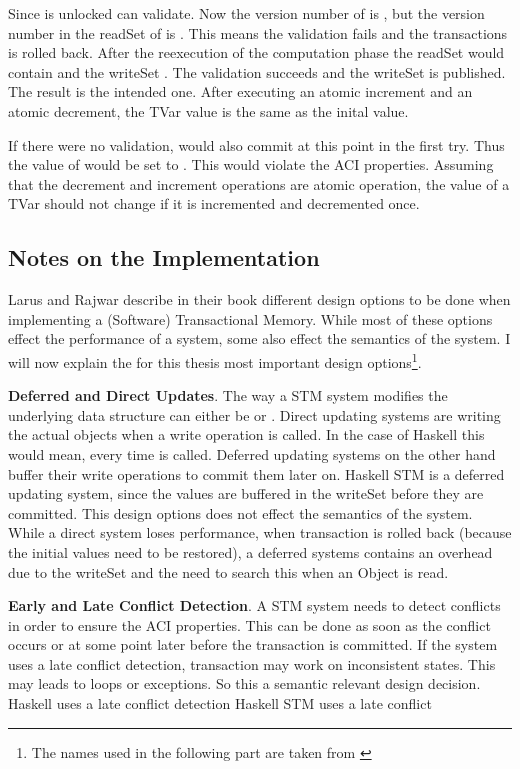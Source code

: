 Since  is unlocked  can validate. Now the version number of  is , but the version
number in the readSet of  is . This means the validation fails and the transactions is rolled back. 
After the reexecution of the computation phase the readSet would contain  and the writeSet . 
The validation succeeds and the writeSet is published. The result is the intended one. After executing an atomic increment
and an atomic decrement, the TVar value is the same as the inital value.

If there were no validation,  would also commit at this point in the first try. Thus the value of  would be set to . 
This would violate the ACI properties. Assuming that the decrement and increment operations are atomic operation, 
the value of a TVar should not change if it is incremented and decremented once.

\subsection{Notes on the Implementation}
Larus and Rajwar describe in their book\parencite[Chapter 2]{transBook} different design options to be done when implementing a 
(Software) Transactional Memory. While most of these options effect the performance of a system, some also effect the 
semantics of the system. I will now explain the for this thesis most important design options\footnote{The names used in the 
following part are taken from \parencite[Chapter 2]{transBook}}.

\textbf{Deferred and Direct Updates}. The way a STM system modifies the underlying data structure can either be 
or . Direct updating systems are writing the actual objects when a write operation is called. In the case of Haskell 
this would mean, every time  is called. Deferred updating systems on the other hand buffer their write operations to
commit them later on. Haskell STM is a deferred updating system, since the values are buffered in the writeSet before they are
committed. This design options does not effect the semantics of the system. While a direct system loses performance, when transaction
is rolled back (because the initial values need to be restored), a deferred systems contains an overhead due to the writeSet and the 
need to search this when an Object is read.

\textbf{Early and Late Conflict Detection}. A STM system needs to detect conflicts in order to ensure the ACI properties. This can 
be done as soon as the conflict occurs or at some point later before the transaction is committed. If the system uses a late conflict 
detection, transaction may work on inconsistent states. This may leads to loops or exceptions. So this a semantic relevant design 
decision. Haskell uses a late conflict detection
Haskell STM uses a late conflict 

